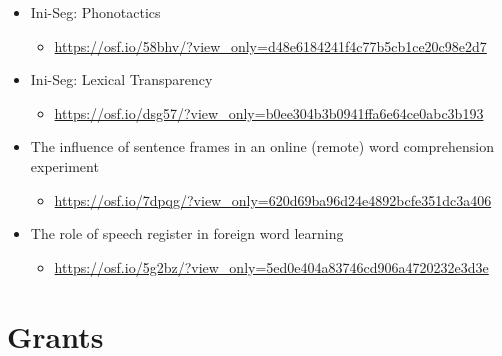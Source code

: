 \documentclass[10pt,a4paper,]{article}
\providecommand{\tightlist}{%
  \setlength{\itemsep}{0pt}\setlength{\parskip}{0pt}}
\begin{document}
\begin{itemize}
\tightlist
\item
  Ini-Seg: Phonotactics

  \begin{itemize}
  \tightlist
  \item
    \url{https://osf.io/58bhv/?view_only=d48e6184241f4c77b5cb1ce20c98e2d7}
  \end{itemize}
\item
  Ini-Seg: Lexical Transparency

  \begin{itemize}
  \tightlist
  \item
    \url{https://osf.io/dsg57/?view_only=b0ee304b3b0941ffa6e64ce0abc3b193}
  \end{itemize}
\item
  The influence of sentence frames in an online (remote) word
  comprehension experiment

  \begin{itemize}
  \tightlist
  \item
    \url{https://osf.io/7dpqg/?view_only=620d69ba96d24e4892bcfe351dc3a406}
  \end{itemize}
\item
  The role of speech register in foreign word learning

  \begin{itemize}
  \tightlist
  \item
    \url{https://osf.io/5g2bz/?view_only=5ed0e404a83746cd906a4720232e3d3e}
  \end{itemize}
\end{itemize}

\hypertarget{grants}{%
\section{Grants}\label{grants}}
\end{document}
